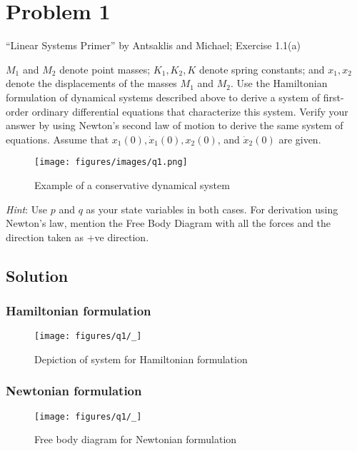 \section*{Problem 1}

``Linear Systems Primer'' by Antsaklis and Michael;
Exercise 1.1(a)

\(M_1\) and \(M_2\) denote point masses; \(K_1, K_2, K\) denote spring constants; and \(x_1,x_2\) denote the displacements of the masses \(M_1\) and \(M_2\).
Use the Hamiltonian formulation of dynamical systems described above to derive a system of first-order ordinary differential equations that characterize this system.
Verify your answer by using Newton's second law of motion to derive the same system of equations.
Assume that \(x_1(0), \dot x_1(0), x_2(0)\), and \(\dot x_2(0)\) are given.

\begin{figure}[h]
    \centering
    \texttt{[image: figures/images/q1.png]}
    \caption{
        Example of a conservative dynamical system
    }\label{fig:q1}
\end{figure}

\textit{Hint}: Use \(p\) and \(q\) as your state variables in both cases.
For derivation using Newton's law, mention the Free Body Diagram with all the forces and the direction taken as +ve direction.

\subsection*{Solution}

\subsubsection*{Hamiltonian formulation}

\begin{figure}[htb]
    \centering
    \texttt{[image: figures/q1/\_]}
    \caption{
        Depiction of system for Hamiltonian formulation
    }\label{fig:q1-hamiltonian}
\end{figure}

\subsubsection*{Newtonian formulation}

\begin{figure}[htb]
    \centering
    \texttt{[image: figures/q1/\_]}
    \caption{
        Free body diagram for Newtonian formulation
    }\label{fig:q1-newtonian}
\end{figure}
